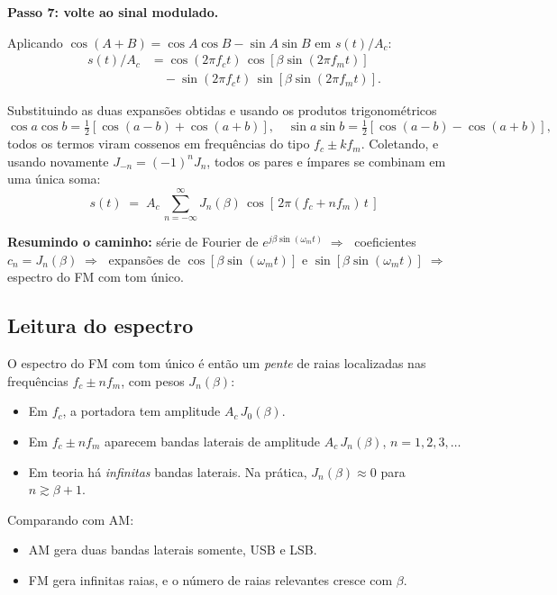 \documentclass[11pt,a4paper]{article}
\begin{document}
\begin{quadro}
\textbf{Passo 7: volte ao sinal modulado.}

Aplicando $\cos(A+B)=\cos A\cos B-\sin A\sin B$ em $s(t)/A_c$:
\begin{align*}
  s(t)/A_c
  &= \cos(2\pi f_c t)\,\cos[\beta\sin(2\pi f_m t)] \\
  &\quad - \sin(2\pi f_c t)\,\sin[\beta\sin(2\pi f_m t)].
\end{align*}

Substituindo as duas expansões obtidas e usando os produtos trigonométricos
\[
  \cos a\cos b = \tfrac{1}{2}[\cos(a-b)+\cos(a+b)],
  \quad
  \sin a\sin b = \tfrac{1}{2}[\cos(a-b)-\cos(a+b)],
\]
todos os termos viram cossenos em frequências do tipo $f_c \pm k f_m$. Coletando, e usando novamente $J_{-n}=(-1)^n J_n$, todos os pares e ímpares se combinam em uma única soma:
\[
  \boxed{\;s(t) \;=\; A_c\,\sum_{n=-\infty}^{\infty} J_n(\beta)\,\cos[\,2\pi(f_c + n f_m)\,t\,]\;}
\]

\textbf{Resumindo o caminho:} série de Fourier de $e^{j\beta\sin(\omega_m t)} \;\Rightarrow\;$ coeficientes $c_n = J_n(\beta) \;\Rightarrow\;$ expansões de $\cos[\beta\sin(\omega_m t)]$ e $\sin[\beta\sin(\omega_m t)] \;\Rightarrow\;$ espectro do FM com tom único.
\end{quadro}

\subsection{Leitura do espectro}

O espectro do FM com tom único é então um \emph{pente} de raias localizadas nas frequências $f_c \pm n f_m$, com pesos $J_n(\beta)$:
\begin{itemize}
  \item Em $f_c$, a portadora tem amplitude $A_c\,J_0(\beta)$.
  \item Em $f_c \pm n f_m$ aparecem bandas laterais de amplitude $A_c\,J_n(\beta)$, $n=1,2,3,\ldots$
  \item Em teoria há \emph{infinitas} bandas laterais. Na prática, $J_n(\beta)\approx 0$ para $n \gtrsim \beta+1$.
\end{itemize}

Comparando com AM:
\begin{itemize}
  \item AM gera duas bandas laterais somente, USB e LSB.
  \item FM gera infinitas raias, e o número de raias relevantes cresce com $\beta$.
\end{itemize}
\end{document}
